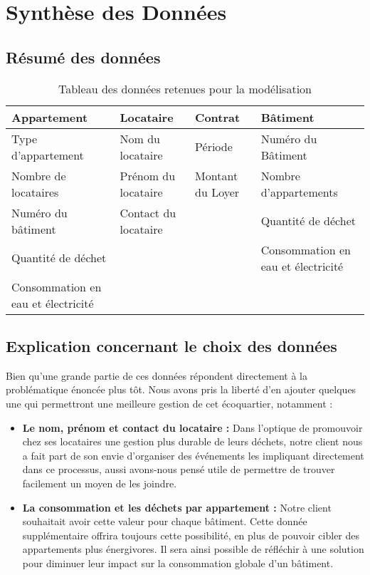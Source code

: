 \chapter{Synthèse des Données}

\section{Résumé des données}

\begin{table}[h]
\centering
\begin{tabularx}{\textwidth}{|X|X|X|X|}
\hline
\textbf{Appartement} & \textbf{Locataire} & \textbf{Contrat} & \textbf{Bâtiment}\\
\hline
Type d'appartement & Nom du locataire & Période & Numéro du Bâtiment \\
\hline
Nombre de locataires & Prénom du locataire & Montant du Loyer & Nombre d'appartements \\
\hline
Numéro du bâtiment & Contact du locataire & & Quantité de déchet \\
\hline
Quantité de déchet & & & Consommation en eau et électricité \\
\hline
Consommation en eau et électricité & & & \\
\hline
\end{tabularx}
\caption{Tableau des données retenues pour la modélisation}
\end{table}

\section{Explication concernant le choix des données}

Bien qu'une grande partie de ces données répondent directement à la problématique énoncée plus tôt. Nous avons pris la liberté d'en ajouter quelques une qui permettront une meilleure gestion de cet écoquartier, notamment :
\begin{itemize}
\item \textbf{Le nom, prénom et contact du locataire :} Dans l'optique de promouvoir chez ses locataires une gestion plus durable de leurs déchets, notre client nous a fait part de son envie d'organiser des événements les impliquant directement dans ce processus, aussi avons-nous pensé utile de permettre de trouver facilement un moyen de les joindre.
\item \textbf{La consommation et les déchets par appartement :} Notre client souhaitait avoir cette valeur pour chaque bâtiment. Cette donnée supplémentaire offrira toujours cette possibilité, en plus de pouvoir cibler des appartements plus énergivores. Il sera ainsi possible de réfléchir à une solution pour diminuer leur impact sur la consommation globale d'un bâtiment.
\end{itemize}
